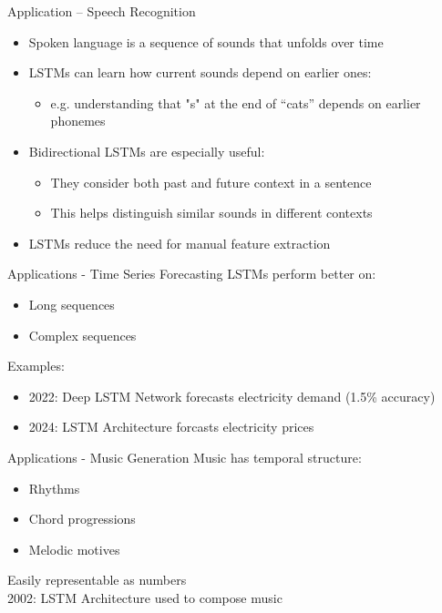 \documentclass[10pt, aspectratio=169]{beamer}
\begin{document}
\begin{frame}[t]{Application – Speech Recognition}
\begin{itemize}
  \item Spoken language is a sequence of sounds that unfolds over time
  \pause
  \item LSTMs can learn how current sounds depend on earlier ones:
    \begin{itemize}
      \item e.g. understanding that "s" at the end of “cats” depends on earlier phonemes
    \end{itemize}
  \pause
  \item Bidirectional LSTMs are especially useful:
    \begin{itemize}
      \item They consider both past and future context in a sentence
      \item This helps distinguish similar sounds in different contexts
    \end{itemize}
  \pause
  \item LSTMs reduce the need for manual feature extraction
\end{itemize}
\end{frame}

\begin{frame}[t]{Applications - Time Series Forecasting}
LSTMs perform better on: \pause
\begin{itemize}
    \item Long sequences \pause
    \item Complex sequences \pause
\end{itemize}
Examples: \pause
\begin{itemize}
    \item 2022: Deep LSTM Network forecasts electricity demand (1.5\% accuracy) \pause
    \item 2024: LSTM Architecture forcasts electricity prices \pause
\end{itemize}
\end{frame}


\begin{frame}[t]{Applications - Music Generation}
Music has temporal structure: \pause
\begin{itemize}
    \item Rhythms \pause
    \item Chord progressions \pause
    \item Melodic motives \pause
\end{itemize}
Easily representable as numbers\pause \\
2002: LSTM Architecture used to compose music \pause
\end{frame}
\end{document}

